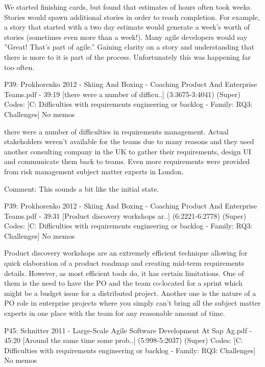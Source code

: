 \documentclass[preprint,authoryear,12pt]{elsarticle}
\begin{document}
We started ﬁnishing cards,
but found that estimates of hours often took weeks. Stories
would spawn additional stories in order to reach completion. For example, a story that started with a two day estimate would generate a week’s worth of stories (sometimes
even more than a week!). Many agile developers would say
”Great! That’s part of agile.” Gaining clarity on a story and
understanding that there is more to it is part of the process. Unfortunately this was happening far too often.


P39: Prokhorenko 2012 - Skiing And Boxing - Coaching Product And Enterprise Teams.pdf - 39:19 [there were a number of difficu..]  (3:3675-3:4041)   (Super)
Codes:	[C: Difficulties with requirements engineering or backlog - Family: RQ3: Challenges] 
No memos

there were a number of difficulties in 
requirements management. Actual stakeholders weren’t 
available for the teams due to  many reasons and they used 
another consulting company in the UK to gather their 
requirements, design UI and communicate them back to teams. 
Even more requirements were provided from risk management 
subject matter experts in London.

Comment:
This sounds a bit like the initial state.

P39: Prokhorenko 2012 - Skiing And Boxing - Coaching Product And Enterprise Teams.pdf - 39:31 [Product discovery workshops ar..]  (6:2221-6:2778)   (Super)
Codes:	[C: Difficulties with requirements engineering or backlog - Family: RQ3: Challenges] 
No memos

Product discovery workshops are an extremely efficient 
technique allowing for quick elaboration of a product roadmap 
and creating mid-term requirements details. However, as most 
efficient tools do, it has certain limitations. One of them is the 
need to have the PO and the team co-located for a sprint which 
might be a budget issue for a distributed project. Another one is 
the nature of a PO role in enterprise projects where you simply 
can’t bring all the subject matter experts in one place with the 
team for any reasonable amount of time.


P45: Schnitter 2011 - Large-Scale Agile Software Development At Sap Ag.pdf - 45:20 [Around the same time some prob..]  (5:998-5:2037)   (Super)
Codes:	[C: Difficulties with requirements engineering or backlog - Family: RQ3: Challenges] 
No memos
\end{document}
